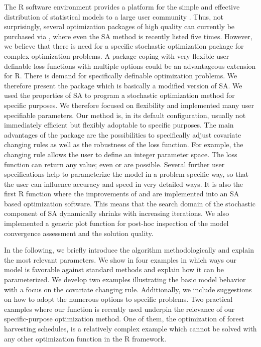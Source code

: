 The R software environment provides a platform for the simple and effective distribution of statistical models to a large user community \citep{xiang_2013}. Thus, not surprisingly, several optimization packages of high quality can currently be purchased via  \citep{theussl_2016}, where even the SA method is recently listed five times. However, we believe that there is need for a specific stochastic optimization package for complex optimization problems. A package coping with very flexible user definable loss functions with multiple options could be an advantageous extension for R. There is demand for specifically definable optimization problems. We therefore present the package  which is basically a modified version of SA. We used the properties of SA to program a stochastic optimization method for specific purposes. We therefore focused on flexibility and implemented many user specifiable parameters. Our method is, in its default configuration, usually not immediately efficient but flexibly adoptable to specific purposes. The main advantages of the package are the possibilities to specifically adjust covariate changing rules as well as the robustness of the loss function. For example, the changing rule allows the user to define an integer parameter space. The loss function can return any value; even  or  are possible. Several further user specifications help to parameterize the model in a problem-specific way, so that the user can influence accuracy and speed in very detailed ways. It is also the first R function where the improvements of \citet{corana_1987} and \citet{pronzato_1984} are implemented into an SA based optimization software. This means that the search domain of the stochastic component of SA dynamically shrinks with increasing iterations. We also implemented a generic plot function for post-hoc inspection of the model convergence assessment and the solution quality.

In the following, we briefly introduce the algorithm methodologically and explain the most relevant parameters. We show in four examples in which ways our model is favorable against standard methods and explain how it can be parameterized. We develop two examples illustrating the basic model behavior with a focus on the covariate changing rule. Additionally, we include suggestions on how to adopt the numerous options to specific problems. Two practical examples where our function is recently used underpin the relevance of our specific-purpose optimization method. One of them, the optimization of forest harvesting schedules, is a relatively complex example which cannot be solved with any other optimization function in the R framework.

